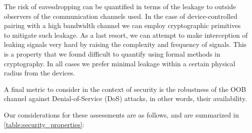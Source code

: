 \documentclass[conference, 11pt]{sty/IEEEtran}
\begin{document}
The risk of eavesdropping can be quantified in terms of the leakage to outside observers of the communication channels used.
In the case of device-controlled pairing with a high bandwidth channel we can employ cryptographic primitives to mitigate such leakage.
As a last resort, we can attempt to make interception of leaking signals very hard by raising the complexity and frequency of signals.
This is a property that we found difficult to quantify using formal methods in cryptography.
In all cases we prefer minimal leakage within a certain physical radius from the devices.

A final metric to consider in the context of security is the robustness of the OOB channel against Denial-of-Service (DoS) attacks, in other words, their availability.

Our considerations for these assessments are as follows, and are summarized in \autoref{table:security_properties}:
\end{document}
